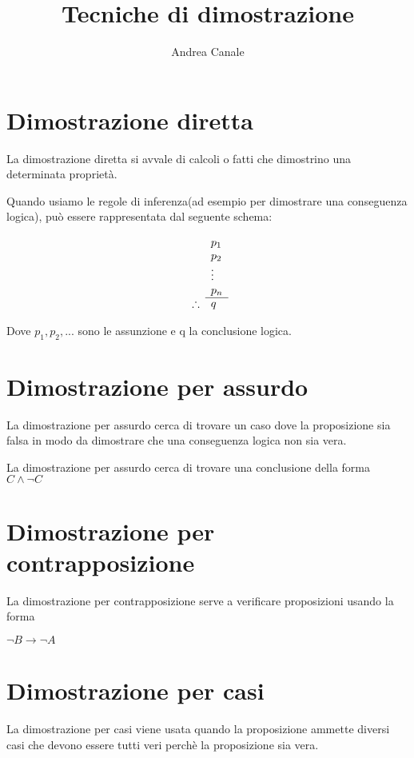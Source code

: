 \documentclass[a4paper]{article}
\title{Tecniche di dimostrazione}
\author{Andrea Canale}
\begin{document}
\maketitle
\tableofcontents

\section{Dimostrazione diretta}
La dimostrazione diretta si avvale di calcoli o fatti che dimostrino una determinata proprietà.

Quando usiamo le regole di inferenza(ad esempio per dimostrare una conseguenza logica), può essere rappresentata dal seguente schema: 

\[
\begin{array}{ r l }
	& p_1 \\
	& p_2 \\
	& \vdots \\
	& p_n \\
	\cline{2-2}
	\therefore & q
\end{array}
\]

Dove $p_1, p_2, ...$ sono le assunzione e q la conclusione logica.

\section{Dimostrazione per assurdo}

La dimostrazione per assurdo cerca di trovare un caso dove la proposizione sia falsa in modo da dimostrare che una conseguenza logica non sia vera.

La dimostrazione per assurdo cerca di trovare una conclusione della forma $ C \land \neg C$

\section{Dimostrazione per contrapposizione}

La dimostrazione per contrapposizione serve a verificare proposizioni usando la forma 

$\neg B \rightarrow \neg A$

\section{Dimostrazione per casi}

La dimostrazione per casi viene usata quando la proposizione ammette diversi casi che devono essere tutti veri perchè la proposizione sia vera.
\end{document}
